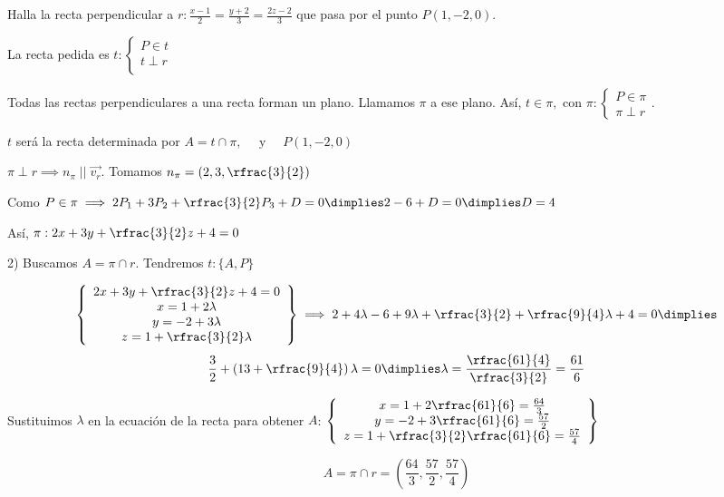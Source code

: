 \begin{problem}

Halla la recta perpendicular a $r:\frac{x-1}{2} = \frac{y+2}{3} = \frac{2z-2}{3}$ que pasa por el punto $P(1,-2,0)$.

\solution

La recta pedida es $t:\left\{\begin{array}{c}P\in t\\t\perp r\\\end{array}\right.$ 

Todas las rectas perpendiculares a una recta forman un plano. Llamamos $\pi$ a ese plano. Así, $ t \in \pi, \text{ con } \pi:\left\{\begin{array}{c}P\in\pi\\\pi\perp r\end{array}\right.$. 

$t$ será la recta determinada por $A = t\cap\pi,\quad\text{ y }\quad  P(1,-2,0)$

$\pi\perp r\implies n_{\pi} \;||\; \vec{v_r}$. Tomamos $n_{\pi}  = \left(2,3,\rfrac{3}{2}\right)$

Como $P\in\pi\implies 2P_1 + 3P_2 +\rfrac{3}{2}P_3 + D = 0 \dimplies 2-6+D = 0 \dimplies D=4$

Así, $\pi: 2x+3y+\rfrac{3}{2}z + 4 = 0$

2) Buscamos $A=\pi\cap r$. Tendremos $t:\{A,P\}$


\[
  \left\{\begin{array}{c}
    2x+3y+\rfrac{3}{2}z + 4 = 0\\
    x = 1 + 2\lambda\\
    y = -2 + 3\lambda\\
    z = 1 + \rfrac{3}{2}\lambda\end{array}\right\} \implies 2+4\lambda - 6 + 9\lambda + \rfrac{3}{2} + \rfrac{9}{4}\lambda + 4 = 0 \dimplies 
\]
\[
  \frac{3}{2}+\left(13+\rfrac{9}{4}\right)\lambda = 0 \dimplies \lambda = \frac{\rfrac{61}{4}}{\rfrac{3}{2}} = \frac{61}{6}
\]

Sustituimos $\lambda$ en la ecuación de la recta para obtener $A$:
$\left\{\begin{array}{c}
    x = 1 + 2\rfrac{61}{6} = \frac{64}{3}\\
    y = -2 + 3\rfrac{61}{6} = \frac{57}{2}\\
    z = 1 + \rfrac{3}{2}\rfrac{61}{6} = \frac{57}{4}
\end{array}\right\}$


\[A = \pi\cap r = \left(\frac{64}{3},\frac{57}{2},\frac{57}{4}\right)\]


\end{problem}
